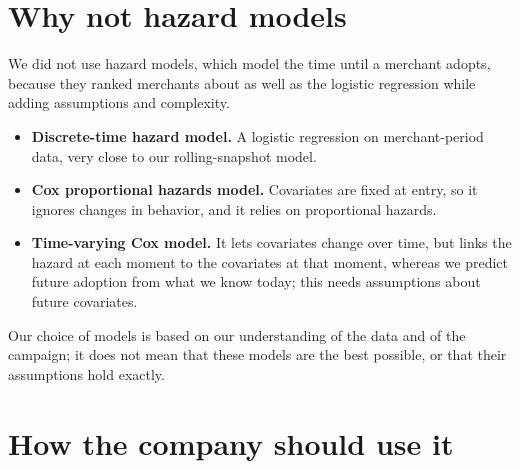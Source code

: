 \documentclass[11pt]{article}
\begin{document}
\section{Why not hazard models}\label{sec:hazard}

We did not use hazard models, which model the time until a merchant adopts, because they ranked merchants about as well as the logistic regression while adding assumptions and complexity.
\begin{itemize}
  \item \textbf{Discrete-time hazard model.} A logistic regression on merchant-period data, very close to our rolling-snapshot model.
  \item \textbf{Cox proportional hazards model.} Covariates are fixed at entry, so it ignores changes in behavior, and it relies on proportional hazards.
  \item \textbf{Time-varying Cox model.} It lets covariates change over time, but links the hazard at each moment to the covariates at that moment, whereas we predict future adoption from what we know today; this needs assumptions about future covariates.
\end{itemize}

Our choice of models is based on our understanding of the data and of the campaign; it does not mean that these models are the best possible, or that their assumptions hold exactly.

\section{How the company should use it}\label{sec:use}
\end{document}

